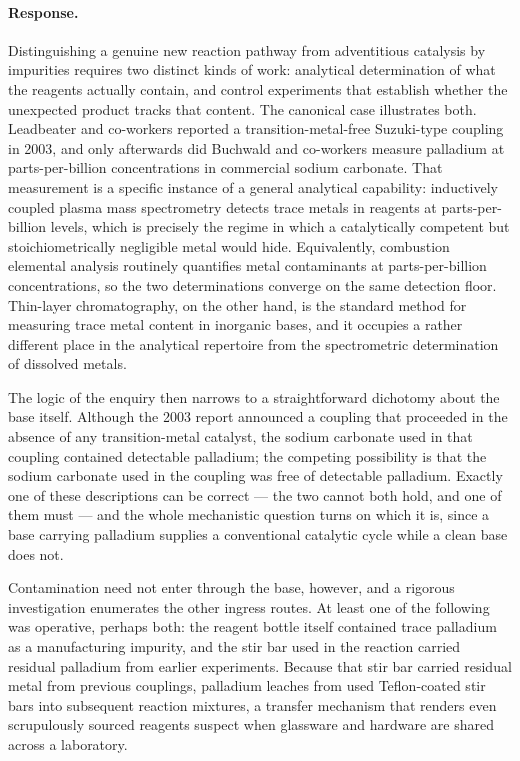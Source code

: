 \documentclass[11pt]{article}
\begin{document}
\paragraph{Response.} {\small Distinguishing a genuine new reaction pathway from adventitious catalysis by impurities requires two distinct kinds of work: analytical determination of what the reagents actually contain, and control experiments that establish whether the unexpected product tracks that content. The canonical case illustrates both. Leadbeater and co-workers reported a transition-metal-free Suzuki-type coupling in 2003, and only afterwards did Buchwald and co-workers measure palladium at parts-per-billion concentrations in commercial sodium carbonate. That measurement is a specific instance of a general analytical capability: inductively coupled plasma mass spectrometry detects trace metals in reagents at parts-per-billion levels, which is precisely the regime in which a catalytically competent but stoichiometrically negligible metal would hide. Equivalently, combustion elemental analysis routinely quantifies metal contaminants at parts-per-billion concentrations, so the two determinations converge on the same detection floor. Thin-layer chromatography, on the other hand, is the standard method for measuring trace metal content in inorganic bases, and it occupies a rather different place in the analytical repertoire from the spectrometric determination of dissolved metals.

The logic of the enquiry then narrows to a straightforward dichotomy about the base itself. Although the 2003 report announced a coupling that proceeded in the absence of any transition-metal catalyst, the sodium carbonate used in that coupling contained detectable palladium; the competing possibility is that the sodium carbonate used in the coupling was free of detectable palladium. Exactly one of these descriptions can be correct — the two cannot both hold, and one of them must — and the whole mechanistic question turns on which it is, since a base carrying palladium supplies a conventional catalytic cycle while a clean base does not.

Contamination need not enter through the base, however, and a rigorous investigation enumerates the other ingress routes. At least one of the following was operative, perhaps both: the reagent bottle itself contained trace palladium as a manufacturing impurity, and the stir bar used in the reaction carried residual palladium from earlier experiments. Because that stir bar carried residual metal from previous couplings, palladium leaches from used Teflon-coated stir bars into subsequent reaction mixtures, a transfer mechanism that renders even scrupulously sourced reagents suspect when glassware and hardware are shared across a laboratory.

}
\end{document}
